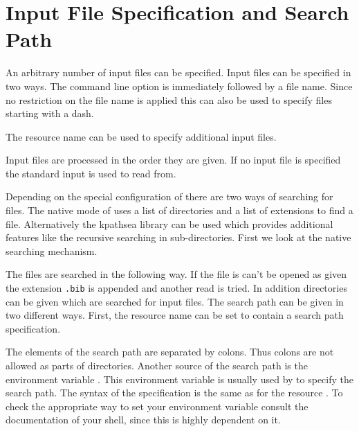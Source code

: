 \documentclass[11pt,a4paper]{scrbook}
\begin{document}
\section{Input File Specification and Search Path}\label{sec:search}

An arbitrary number of input files can be specified. Input files can be
specified in two ways. The command line option  is immediately followed
by a file name. Since no restriction on the file name is applied this can also
be used to specify files starting with a dash.


The resource name  can be used to specify additional input files.

\begin{Resources}
\end{Resources}

Input files are processed in the order they are given. If no input file is
specified the standard input is used to read from.

Depending on the special configuration of \BibTool{} there are two ways of
searching for \BibTeX{} files. The native mode of \BibTool{} uses a list of
directories and a list of extensions to find a file. Alternatively the
kpathsea library can be used which provides additional features like the
recursive searching in sub-directories. First we look at the native \BibTool{}
searching mechanism.

The files are searched in the following way. If the file is can't be opened as
given the extension \texttt{.bib} is appended and another read is tried. In
addition directories can be given which are searched for input files. The
search path can be given in two different ways. First, the resource name
 can be set to contain a search path specification.

\begin{Resources}
\end{Resources}

The elements of the search path are separated by colons. Thus colons are not
allowed as parts of directories. Another source of the search path is the
environment variable . This environment variable is usually
used by \BibTeX{} to specify the search path. The syntax of the specification
is the same as for the resource . To check the
appropriate way to set your environment variable consult the documentation of
your shell, since this is highly dependent on it.
\end{document}
